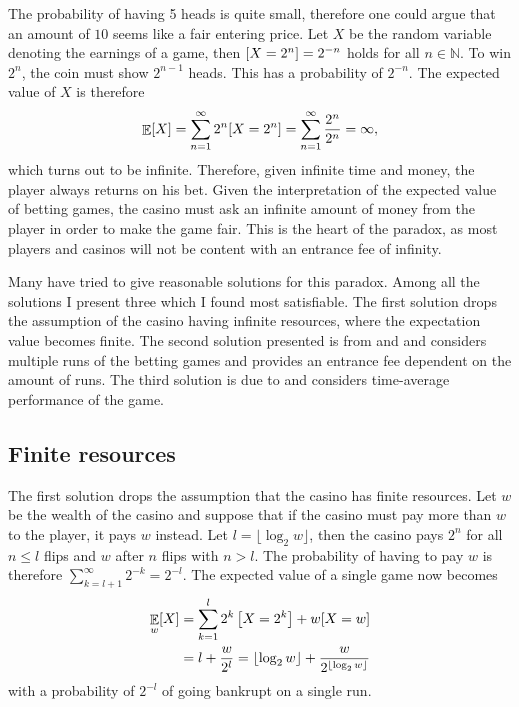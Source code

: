 \documentclass[twoside,a4paper]{article}
\theoremstyle{plain}
\theoremstyle{definition}
\theoremstyle{remark}
\numberwithin{equation}{section}
\newcommand{\N}{\mathbb{N}}
\let\P\relax
\DeclareMathOperator{\P}{\mathbb{P}}
\DeclareMathOperator{\E}{\mathbb{E}}
\DeclareMathOperator{\1}{\mathbbm{1}}
\begin{document}
The probability of having 5 heads is quite small, therefore one could argue that an amount of $10$ seems like a fair entering price. Let $X$ be the random variable denoting the earnings of a game, then $\P[X=2^n]=2^{-n}$ holds for all $n\in\N$. To win $2^n$, the coin must show $2^{n-1}$ heads. This has a probability of $2^{-n}$. The expected value of $X$ is therefore
\[\E[X]=\sum_{n=1}^\infty 2^n\P[X=2^n]=\sum_{n=1}^\infty\frac{2^n}{2^n}=\infty,\]
which turns out to be infinite. Therefore, given infinite time and money, the player always returns on his bet. Given the interpretation of the expected value of betting games, the casino must ask an infinite amount of money from the player in order to make the game fair. This is the heart of the paradox, as most players and casinos will not be content with an entrance fee of infinity.

Many have tried to give reasonable solutions for this paradox. Among all the solutions I present three which I found most satisfiable. The first solution drops the assumption of the casino having infinite resources, where the expectation value becomes finite. The second solution presented is from \cite{Feller50} and \cite{Feller71} and considers multiple runs of the betting games and provides an entrance fee dependent on the amount of runs. The third solution is due to \cite{Peters11} and considers time-average performance of the game.

\subsection{Finite resources}
The first solution drops the assumption that the casino has finite resources. Let $w$ be the wealth of the casino and suppose that if the casino must pay more than $w$ to the player, it pays $w$ instead. Let $l=\lfloor\log_2 w\rfloor$, then the casino pays $2^n$ for all $n\leq l$ flips and $w$ after $n$ flips with $n> l$. The probability of having to pay $w$ is therefore $\sum_{k=l+1}^\infty 2^{-k}=2^{-l}$. The expected value of a single game now becomes
\begin{align*}
\E_w[X]&=\sum_{k=1}^{l}2^{k}\P\left[X=2^k\right]+w\P[X=w]\\
&=l+\frac{w}{2^l}=\lfloor\log_2 w\rfloor+\frac{w}{2^{\lfloor\log_2 w\rfloor}}
\end{align*}
with a probability of $2^{-l}$ of going bankrupt on a single run.
\end{document}
